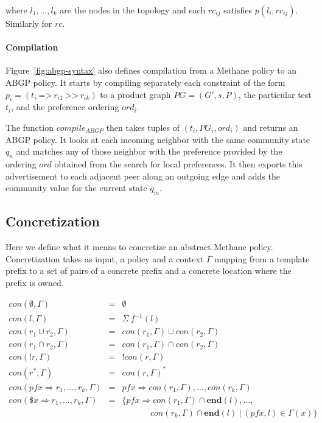 \documentclass[twocolumn]{sig-alternate-10pt}
\newcommand{\sysname}{{\small \sf Methane}\xspace}
\newcommand{\para}[1]{\paragraph*{\textbf{#1}}}
\newcommand{\Prefer}{\texttt{>>}}
\newcommand{\Path}{\texttt{=>}}
\begin{document}
where $l_1, ..., l_k$ are the nodes in the topology
and each $rc_{ij}$ satisfies $p(l_i,rc_{ij})$. Similarly for $rc$.

\para{Compilation}

Figure~\ref{fig:abgp-syntax} also defines compilation from a \sysname policy to an ABGP policy. It starts by compiling separately each constraint of the form $p_i = (t_i ~\Path~ r_{i1} ~\Prefer~ r_{ik})$ to a product graph $PG = (G', s, P)$, the particular test $t_i$, and the preference ordering $ord_i$. 

The function $compile_{ABGP}$ then takes tuples of $(t_i, PG_i, ord_i)$ and returns an ABGP policy. It looks at each incoming neighbor with the same community state $q_n$ and matches any of those neighbor with the preference provided by the ordering $ord$ obtained from the search for local preferences. It then exports this advertisement to each adjacent peer along an outgoing edge and adds the community value for the current state $q_m$.


\subsection{Concretization}

Here we define what it means to concretize an abstract \sysname policy. 
Concretization takes as input, a policy and a context $\Gamma$ mapping from a template prefix to a set of pairs of a concrete prefix and a concrete location where the prefix is owned.

\[ \begin{array}{lcl}
  con(\emptyset,\Gamma)                        & = & \emptyset \\
  con(l,\Gamma)                                & = & \Sigma ~ f^{-1}(l) \\
  con(r_1 \cup r_2,\Gamma)                     & = & con(r_1,\Gamma) \cup con(r_2,\Gamma) \\
  con(r_1 \cap r_2,\Gamma)                     & = & con(r_1,\Gamma) \cap con(r_2,\Gamma) \\
  con(!r,\Gamma)                               & = & !con(r,\Gamma) \\
  con(r^*,\Gamma)                              & = & con(r,\Gamma)^* \\
  con(pfx \Rightarrow r_1, \dots, r_k,\Gamma)  & = & pfx \Rightarrow con(r_1,\Gamma), \dots, con(r_k,\Gamma) \\
  con(\$x \Rightarrow r_1, \dots, r_k,\Gamma)  & = & \{ pfx \Rightarrow con(r_1,\Gamma) \cap \textbf{end}(l), \dots, \\
  & & ~~~~~~~~~~~~~~~ con(r_k,\Gamma) \cap \textbf{end}(l) ~\vert~ (pfx,l) \in \Gamma(x) \} \\
\end{array} \]
\end{document}
